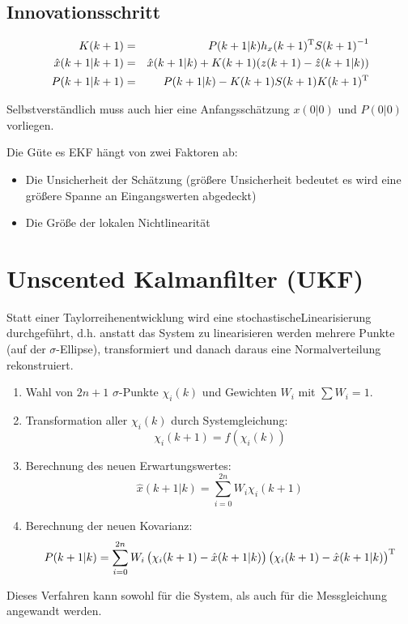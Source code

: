\subsection{Innovationsschritt}
\begin{eqnarray*}
    K(k+1) &=& P(k+1|k) h_x(k+1)^\text{T} {S(k+1)}^{-1} \\
    \hat{x}(k+1|k+1) &=& \hat{x}(k+1|k) + K(k+1) (z(k+1) - \hat{z}(k+1|k)) \\
    P(k+1|k+1) &=& P(k+1|k) - K(k+1)S(k+1)K(k+1)^\text{T}
\end{eqnarray*}

Selbstverständlich muss auch hier eine Anfangsschätzung $x(0|0)$ und $P(0|0)$ vorliegen.

Die Güte es EKF hängt von zwei Faktoren ab:
\begin{itemize}
    \item Die Unsicherheit der Schätzung (größere Unsicherheit bedeutet es wird eine größere Spanne an Eingangswerten
        abgedeckt)
    \item Die Größe der lokalen Nichtlinearität
\end{itemize}

\section{Unscented Kalmanfilter (UKF)}
Statt einer Taylorreihenentwicklung wird eine \glqq stochastische\grqq Linearisierung durchgeführt, d.h. anstatt das System
zu linearisieren werden mehrere Punkte (auf der $\sigma$-Ellipse), transformiert und danach daraus eine 
Normalverteilung rekonstruiert.

\begin{enumerate}
    \item Wahl von $2n+1$ $\sigma$-Punkte $\chi_i(k)$ und Gewichten $W_i$ mit $\sum W_i = 1$.
    \item Transformation aller $\chi_i(k)$ durch Systemgleichung:
        \begin{equation*}
            \chi_i(k+1) = f(\chi_i(k))
        \end{equation*}
    \item Berechnung des neuen Erwartungswertes:
        \begin{equation*}
            \hat{x}(k+1|k) = \sum_{i=0}^{2n} W_i \chi_i(k+1)
        \end{equation*}
    \item Berechnung der neuen Kovarianz:
        \begin{equation*}
            P(k+1|k) = \sum_{i=0}^{2n} W_i \left(\chi_i(k+1) - \hat{x}(k+1|k) \right) 
                \left(\chi_i(k+1) - \hat{x}(k+1|k) \right)^\text{T}
        \end{equation*}
\end{enumerate}
Dieses Verfahren kann sowohl für die System, als auch für die Messgleichung angewandt werden.

